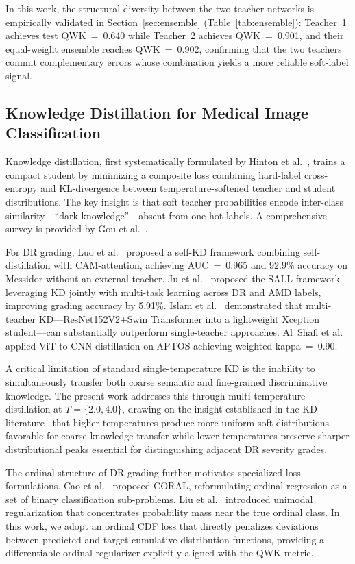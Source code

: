 \documentclass[10pt, twocolumn]{article}
\begin{document}
In this work, the structural diversity between the two teacher networks is
empirically validated in Section~\ref{sec:ensemble} (Table~\ref{tab:ensemble}):
Teacher~1 achieves test QWK~=~0.640 while Teacher~2 achieves QWK~=~0.901, and
their equal-weight ensemble reaches QWK~=~0.902, confirming that the two teachers
commit complementary errors whose combination yields a more reliable soft-label
signal.

\subsection{Knowledge Distillation for Medical Image Classification}

Knowledge distillation, first systematically formulated by Hinton et
al.~\cite{hinton2015}, trains a compact student by minimizing a composite loss
combining hard-label cross-entropy and KL-divergence between temperature-softened
teacher and student distributions. The key insight is that soft teacher
probabilities encode inter-class similarity---``dark knowledge''---absent from
one-hot labels. A comprehensive survey is provided by Gou et al.~\cite{gou2021}.

For DR grading, Luo et al.~\cite{luo2020} proposed a self-KD framework combining
self-distillation with CAM-attention, achieving AUC~=~0.965 and 92.9\% accuracy on
Messidor without an external teacher. Ju et al.~\cite{ju2021} proposed the SALL
framework leveraging KD jointly with multi-task learning across DR and AMD labels,
improving grading accuracy by 5.91\%. Islam et al.~\cite{islam2023} demonstrated
that multi-teacher KD---ResNet152V2+Swin Transformer into a lightweight Xception
student---can substantially outperform single-teacher approaches. Al~Shafi et
al.~\cite{alshafi2024} applied ViT-to-CNN distillation on APTOS achieving weighted
kappa~=~0.90.

A critical limitation of standard single-temperature KD is the inability to
simultaneously transfer both coarse semantic and fine-grained discriminative
knowledge. The present work addresses this through multi-temperature distillation at
$T = \{2.0, 4.0\}$, drawing on the insight established in the KD
literature~\cite{hinton2015,gou2021} that higher temperatures produce more uniform
soft distributions favorable for coarse knowledge transfer while lower temperatures
preserve sharper distributional peaks essential for distinguishing adjacent DR
severity grades.

The ordinal structure of DR grading further motivates specialized loss formulations.
Cao et al.~\cite{cao2020} proposed CORAL, reformulating ordinal regression as a set
of binary classification sub-problems. Liu et al.~\cite{liu2020} introduced
unimodal regularization that concentrates probability mass near the true ordinal
class. In this work, we adopt an ordinal CDF loss that directly penalizes
deviations between predicted and target cumulative distribution functions, providing
a differentiable ordinal regularizer explicitly aligned with the QWK metric.
\end{document}
